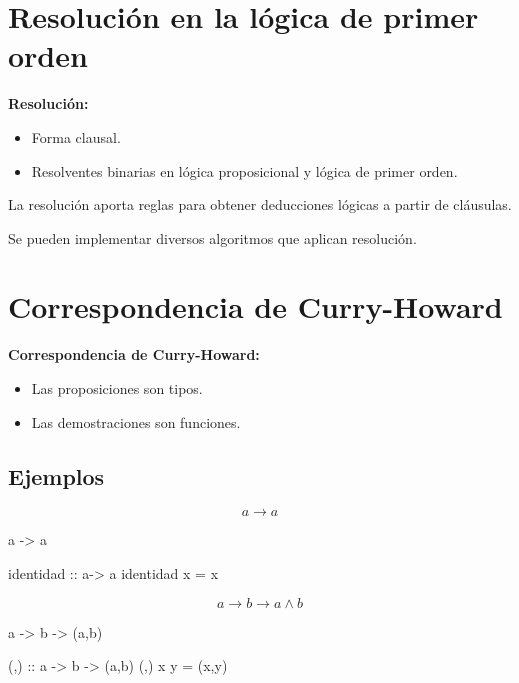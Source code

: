 \documentclass{beamer}
\begin{document}
\section{Resolución en la lógica de primer orden}
\begin{frame}
  \textbf{Resolución:}

  \begin{itemize}
  \item Forma clausal.
  \item Resolventes binarias en lógica proposicional y lógica de primer orden.
  \end{itemize}
  La resolución aporta reglas para obtener deducciones lógicas a partir de cláusulas.

  Se pueden implementar diversos algoritmos que aplican resolución.
\end{frame}
\section{Correspondencia de Curry-Howard}
\begin{frame}
  \textbf{Correspondencia de Curry-Howard:}
\vspace{5mm}
  \begin{itemize}
  \item Las proposiciones son tipos.
  \item Las demostraciones son funciones.
  \end{itemize}
\end{frame}


\subsection{Ejemplos}
\begin{frame}[fragile]  
  $$a \rightarrow a$$
\pause
\begin{sesion}
a -> a
\end{sesion}
\pause
\begin{code}
identidad :: a-> a
identidad x = x
\end{code}  

\end{frame}

\begin{frame}[fragile]
  $$a \rightarrow b \rightarrow a\wedge b $$
\pause

\begin{sesion}
a -> b -> (a,b)
\end{sesion}
\pause

\begin{code}
(,) :: a -> b -> (a,b)
(,) x y = (x,y)
\end{code}

\end{frame}
\end{document}
